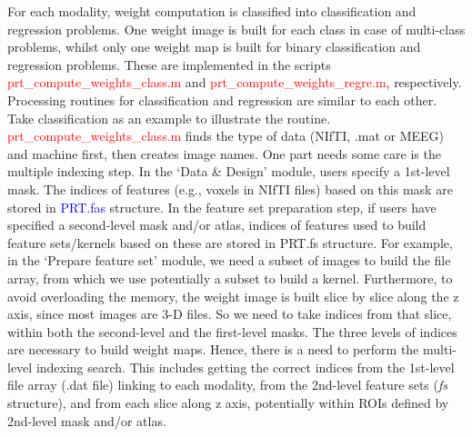 For each modality, weight computation is classified into classification and regression problems. One weight image is built for each class in case of multi-class problems, whilst only one weight map is built for binary classification and regression problems. These are implemented in the scripts \textcolor{red}{prt\_compute\_weights\_class.m} and \textcolor{red}{prt\_compute\_weights\_regre.m}, respectively. Processing routines for classification and regression are similar to each other. Take classification as an example to illustrate the routine. \textcolor{red}{prt\_compute\_weights\_class.m} finds the type of data (NIfTI, .mat or MEEG) and machine first, then creates image names. One part needs some care is the multiple indexing step. In the `Data \& Design' module, users specify a 1st-level mask. The indices of features (e.g., voxels in NIfTI files) based on this mask are stored in \textcolor{blue}{PRT.fas} structure. In the feature set preparation step, if users have specified a second-level mask and/or atlas, indices of features used to build feature sets/kernels based on these are stored in PRT.fs structure. For example, in the `Prepare feature set' module, we need a subset of images to build the file array, from which we use potentially a subset to build a kernel. Furthermore, to avoid overloading the memory, the weight image is built slice by slice along the z axis, since most images are 3-D files. So we need to take indices from that slice, within both the second-level and the first-level masks. The three levels of indices are necessary to build weight maps. Hence, there is a need to perform the multi-level indexing search. This includes getting the correct indices from the 1st-level file array (.dat file) linking to each modality, from the 2nd-level feature sets (\textit{fs} structure), and from each slice along z axis, potentially within ROIs defined by 2nd-level mask and/or atlas.
\\
 
